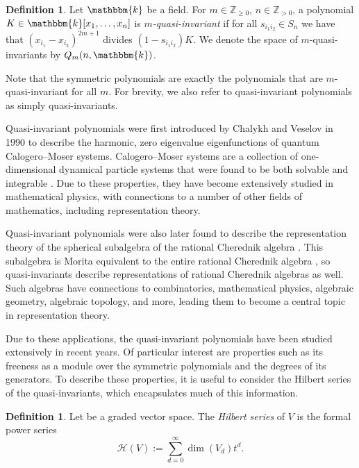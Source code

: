 \documentclass[pdftex]{sigma}
\theoremstyle{definition}
\newtheorem{Definition}[Theorem]{Definition}
\numberwithin{equation}{section}
\renewcommand{\k}{\mathbbm{k}}
\newcommand{\Z}{\mathbb{Z}}
\begin{document}
\begin{Definition}
 Let $\k$ be a field. For $m\in\Z_{\geq 0}$, $n\in\Z_{>0}$, a polynomial $K\in\k[x_1,\dots,x_n]$ is \textit{$m$-quasi-invariant} if for all $s_{i_1i_2}\in S_n$ we have that $(x_{i_1}-x_{i_2})^{2m+1}$ divides $(1-s_{i_1i_2})K$. We denote the space of $m$-quasi-invariants by $Q_m(n,\k)$.
\end{Definition}

Note that the symmetric polynomials are exactly the polynomials that are $m$-quasi-invariant for all $m$. For brevity, we also refer to quasi-invariant polynomials as simply quasi-invariants.

Quasi-invariant polynomials were first introduced by Chalykh and Veselov in 1990 \cite{cmp/1104179957} to describe the harmonic, zero eigenvalue eigenfunctions of quantum Calogero--Moser systems. Calogero--Moser systems are a collection of one-dimensional dynamical particle systems that were found to be both solvable \cite{calogero} and integrable \cite{MOSER1975197}. Due to these properties, they have become extensively studied in mathematical physics, with connections to a number of other fields of mathematics, including representation theory.

Quasi-invariant polynomials were also later found to describe the representation theory of the spherical subalgebra of the rational Cherednik algebra \cite{beg}. This subalgebra is Morita equivalent to the entire rational Cherednik algebra \cite{Etingof2000SymplecticRA}, so quasi-invariants describe representations of rational Cherednik algebras as well. Such algebras have connections to combinatorics, mathematical physics, algebraic geometry, algebraic topology, and more, leading them to become a central topic in representation theory.

Due to these applications, the quasi-invariant polynomials have been studied extensively in recent years. Of particular interest are properties such as its freeness as a module over the symmetric polynomials and the degrees of its generators. To describe these properties, it is useful to consider the Hilbert series of the quasi-invariants, which encapsulates much of this information.

\begin{Definition}
 Let  be a graded vector space. The \textit{Hilbert series} of $V$ is the formal power series
 \[\mathcal{H}(V):=\sum_{d=0}^\infty\dim(V_d)t^d.\]
\end{Definition}
\end{document}
